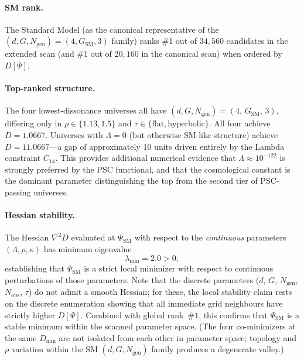 \documentclass[11pt,twocolumn]{article}
\theoremstyle{remark}
\begin{document}
\paragraph{SM rank.}
The Standard Model (as the canonical representative of the
$(d,G,N_{\mathrm{gen}})=(4,G_{\mathrm{SM}},3)$ family) ranks \#1
out of $34{,}560$ candidates in the extended scan (and \#1 out of
$20{,}160$ in the canonical scan) when ordered by $D[\Psi]$.

\paragraph{Top-ranked structure.}
The four lowest-dissonance universes all have
$(d,G,N_{\mathrm{gen}})=(4,\,G_{\mathrm{SM}},\,3)$, differing only in
$\rho\in\{1.13,1.5\}$ and $\tau\in\{\text{flat},\text{hyperbolic}\}$.
All four achieve $D=1.0667$.
Universes with $\Lambda=0$ (but otherwise SM-like structure) achieve
$D=11.0667$—a gap of approximately $10$ units driven entirely by the
Lambda constraint $C_{14}$.
This provides additional numerical evidence that
$\Lambda\approx 10^{-122}$ is strongly preferred by the PSC functional,
and that the cosmological constant is the dominant parameter
distinguishing the top from the second tier of PSC-passing universes.

\paragraph{Hessian stability.}
The Hessian $\nabla^2 D$ evaluated at $\Psi_{\mathrm{SM}}$ with
respect to the \emph{continuous} parameters $(\Lambda, \rho, \kappa)$
has minimum eigenvalue
\begin{equation}
  \lambda_{\min} = 2.0 > 0,
  \label{eq:hessian}
\end{equation}
establishing that $\Psi_{\mathrm{SM}}$ is a strict local minimizer
with respect to continuous perturbations of those parameters.
Note that the discrete parameters ($d$, $G$, $N_{\mathrm{gen}}$,
$N_{\mathrm{obs}}$, $\tau$) do not admit a smooth Hessian; for these,
the local stability claim rests on the discrete enumeration showing
that all immediate grid neighbours have strictly higher $D[\Psi]$.
Combined with global rank~$\#1$, this confirms that $\Psi_{\mathrm{SM}}$
is a stable minimum within the scanned parameter space.
(The four co-minimizers at the same $D_{\min}$ are not isolated from
each other in parameter space; topology and $\rho$ variation within
the SM $(d,G,N_{\mathrm{gen}})$ family produces a degenerate valley.)
\end{document}
